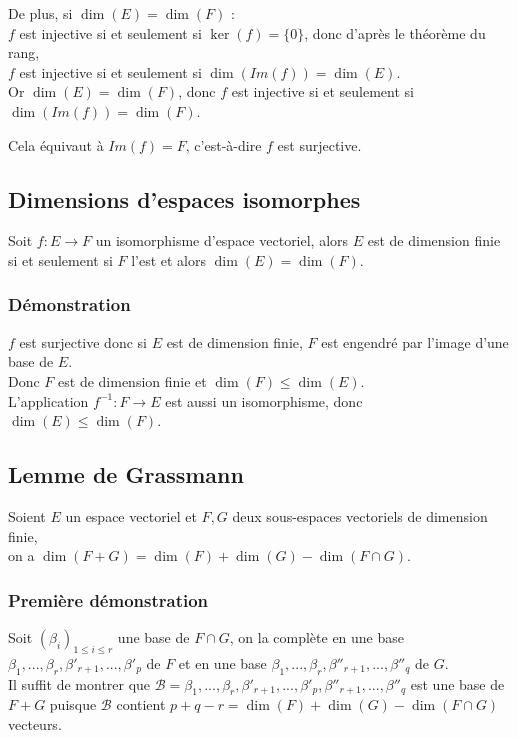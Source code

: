 \documentclass[a4paper,10pt]{book} %
\newcommand{\B}{\mathcal{B}}
\begin{document}
\bigskip

De plus, si $\dim(E)=\dim(F)$ :\\
$f$ est injective si et seulement si $\ker(f)=\{0\}$, donc d'après le théorème du rang,\\
$f$ est injective si et seulement si $\dim(Im(f))=\dim(E)$.\\
Or $\dim(E)=\dim(F)$, donc $f$ est injective si et seulement si $\dim(Im(f))=\dim(F)$.

Cela équivaut à $Im(f)=F$, c'est-à-dire $f$ est surjective.

\newpage

\subsection{Dimensions d'espaces isomorphes}
Soit $f:E\rightarrow F$ un isomorphisme d'espace vectoriel, alors $E$ est de dimension finie\\
si et seulement si $F$ l'est et alors $\dim(E)=\dim(F)$.

\subsubsection{Démonstration}
$f$ est surjective donc si $E$ est de dimension finie, $F$ est engendré par l'image d'une base de $E$.\\
Donc $F$ est de dimension finie et $\dim(F)\leq \dim(E)$.\\
L'application $f^{-1}:F\rightarrow E$ est aussi un isomorphisme, donc $\dim(E)\leq \dim(F)$.

\subsection{Lemme de Grassmann}
Soient $E$ un espace vectoriel et $F,G$ deux sous-espaces vectoriels de dimension finie,\\
on a $\dim(F+G)=\dim(F)+\dim(G)-\dim(F\cap G)$.

\subsubsection{Première démonstration}
Soit $(\beta_i)_{1\leq i\leq r}$ une base de $F\cap G$, on la complète en une base $\beta_1,...,\beta_r,\beta'_{r+1},...,\beta'_{p}$ de $F$ et en une base $\beta_1,...,\beta_r,\beta''_{r+1},...,\beta''_{q}$ de $G$.\\

Il suffit de montrer que $\B=\beta_1,...,\beta_r, \beta'_{r+1},...,\beta'_{p}, \beta''_{r+1},...,\beta''_{q}$ est une base de $F+G$ puisque $\B$ contient $p+q-r=\dim(F)+\dim(G)-\dim(F\cap G)$ vecteurs.
\end{document}
